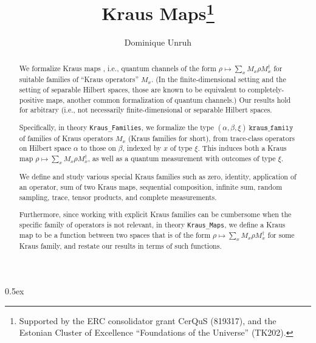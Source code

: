 \documentclass[11pt,a4paper]{article}
\begin{document}
\title{Kraus Maps\thanks{Supported by the ERC consolidator grant CerQuS (819317), and the Estonian Cluster of Excellence ``Foundations of the Universe'' (TK202).}}
\author{Dominique Unruh}
\maketitle

\begin{abstract}
  We formalize Kraus maps \cite[Section 3]{kraus}, i.e., quantum channels of the form $\rho\mapsto\sum_x M_x\rho M_x^\dagger$ for suitable families of ``Kraus operators'' $M_x$.
  (In the finite-dimensional setting and the setting of separable Hilbert spaces,
  those are known to be equivalent to completely-positive maps, another common formalization of quantum channels.)
  Our results hold for arbitrary (i.e., not necessarily finite-dimensional or separable Hilbert spaces.

  Specifically, in theory \texttt{Kraus\_Families}, we formalize the type $(\alpha,\beta,\xi)\ \mathtt{kraus\_family}$ of families of Kraus operators $M_x$ (Kraus families for short),
  from trace-class operators on Hilbert space $\alpha$ to those on $\beta$, indexed by $x$ of type $\xi$.
  This induces both a Kraus map $\rho\mapsto\sum_x M_x\rho M_x^\dagger$, as well as a quantum measurement with outcomes of type $\xi$.

  We define and study various special Kraus families such as zero,
  identity, application of an operator, sum of two Kraus maps,
  sequential composition, infinite sum, random sampling, trace, tensor
  products, and complete measurements.

  Furthermore, since working with explicit Kraus families can be
  cumbersome when the specific family of operators is not relevant, in
  theory \texttt{Kraus\_Maps}, we define a Kraus map to be a function
  between two spaces that is of the form
  $\rho\mapsto\sum_x M_x\rho M_x^\dagger$ for some Kraus family, and
  restate our results in terms of such functions.  
\end{abstract}

\tableofcontents

\parindent 0pt\parskip 0.5ex





\end{document}
